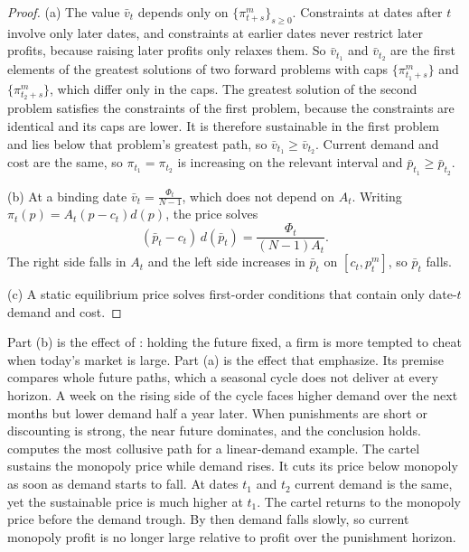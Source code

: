 \begin{proof}
(a) The value $\bar v_t$ depends only on $\{\pi^m_{t+s}\}_{s\ge0}$. Constraints at dates after $t$ involve
only later dates, and constraints at earlier dates never restrict later profits, because raising later
profits only relaxes them. So $\bar v_{t_1}$ and $\bar v_{t_2}$ are the first elements of the greatest
solutions of two forward problems with caps $\{\pi^m_{t_1+s}\}$ and $\{\pi^m_{t_2+s}\}$, which differ only
in the caps. The greatest solution of the second problem satisfies the constraints of the first problem,
because the constraints are identical and its caps are lower. It is therefore sustainable in the first
problem and lies below that problem's greatest path, so $\bar v_{t_1}\ge\bar v_{t_2}$. Current demand and
cost are the same, so $\pi_{t_1}=\pi_{t_2}$ is increasing on the relevant interval and $\bar p_{t_1}\ge
\bar p_{t_2}$.

(b) At a binding date $\bar v_t=\frac{\Phi_t}{N-1}$, which does not depend on $A_t$. Writing
$\pi_t(p)=A_t(p-c_t)d(p)$, the price solves
\begin{equation*}
(\bar p_t-c_t)\,d(\bar p_t)=\frac{\Phi_t}{(N-1)A_t}.
\end{equation*}
The right side falls in $A_t$ and the left side increases in $\bar p_t$ on $[c_t,p^m_t]$, so $\bar p_t$ falls.

(c) A static equilibrium price solves first-order conditions that contain only date-$t$ demand and cost.
\end{proof}

Part (b) is the effect of \citet{RotembergSaloner1986}: holding the future fixed, a firm is more tempted to
cheat when today's market is large. Part (a) is the effect that \citet{HaltiwangerHarrington1991} emphasize.
Its premise compares whole future paths, which a seasonal cycle does not deliver at every horizon. A week
on the rising side of the cycle faces higher demand over the next months but lower demand half a year later.
When punishments are short or discounting is strong, the near future dominates, and the conclusion holds.
 computes the most collusive path for a linear-demand example. The cartel sustains the
monopoly price while demand rises. It cuts its price below monopoly as soon as demand starts to fall. At
dates $t_1$ and $t_2$ current demand is the same, yet the sustainable price is much higher at $t_1$. The cartel
returns to the monopoly price before the demand trough. By then demand falls slowly, so current monopoly profit is
no longer large relative to profit over the punishment horizon.

